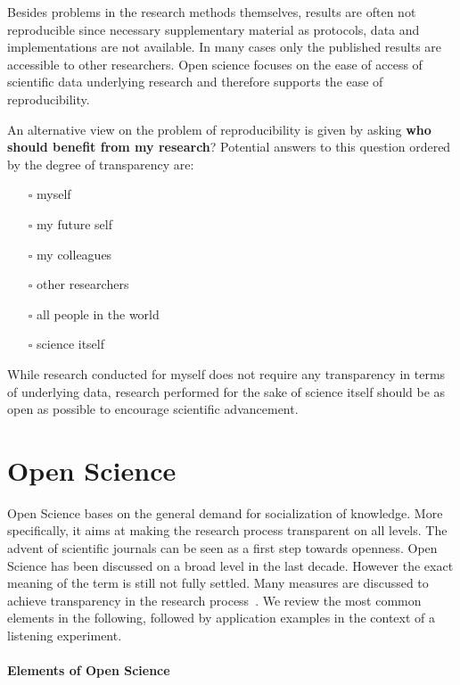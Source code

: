 \documentclass[a4paper, 10pt, twocolumn]{article}
\begin{document}
Besides problems in the research methods themselves, results are often not reproducible since 
necessary supplementary material as protocols, data and implementations are not available. In 
many cases only the published results are accessible to other researchers. Open science 
focuses on the ease of access of scientific data underlying research and therefore supports the ease of reproducibility.

An alternative view on the problem of reproducibility is given by asking 
\textbf{who should benefit from my research}? Potential answers to this question ordered by 
the degree of transparency are:
\begin{itemize}
\item[$\square$] myself
\item[$\square$] my future self
\item[$\square$] my colleagues
\item[$\square$] other researchers
\item[$\square$] all people in the world
\item[$\square$] science itself
\end{itemize}
While research conducted for myself does not require any transparency in terms
of underlying data, research performed for the sake of science itself should be
as open as possible to encourage scientific advancement.


\section*{Open Science} \label{sec:open_science} 

Open Science bases on the general demand for socialization of knowledge. More specifically, 
it aims at making the research process transparent on all levels. The advent of scientific 
journals can be seen as a first step towards openness. Open Science has been discussed on
a broad level in the last decade. However the exact meaning of the term is still not fully 
settled. Many measures are discussed to achieve transparency in the research process~\cite{Pontika15:ACM,Reproducibility15:AMS,Albagli15:Book,Vrana15:MIPRO,Kraker11:TEL}. 
We review the most common elements in the following, followed by application examples in
the context of a listening experiment.


\paragraph*{Elements of Open Science}
\end{document}
